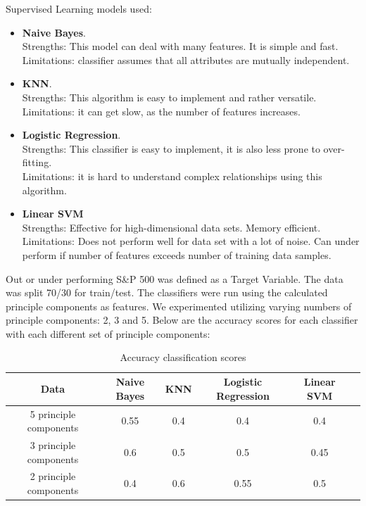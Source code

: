 \documentclass{article}
\begin{document}
Supervised Learning models used: 
\begin{itemize}
    \item \textbf{Naive Bayes}.\\
    Strengths: This model can deal with many features. It is simple and fast.\\ 
    Limitations: classifier assumes that all attributes are mutually independent. 
    \item\textbf{KNN}.\\
    Strengths: This algorithm is easy to implement and rather versatile.\\
    Limitations: it can get slow, as the number of features increases. 
    \item \textbf{Logistic Regression}.\\ 
    Strengths: This classifier is easy to implement, it is also less prone to over-fitting. \\
    Limitations: it is hard to understand complex relationships using this algorithm. 
    \item \textbf{Linear SVM}\\
    Strengths: Effective for high-dimensional data sets. Memory efficient.\\
    Limitations: Does not perform well for data set with a lot of noise. Can under perform if number of features exceeds number of training data samples.
\end{itemize}

Out or under performing S\&P 500 was defined as a Target Variable. The data was split 70/30 for train/test. The classifiers were run using the calculated principle components as features. We experimented utilizing varying numbers of principle components: 2, 3 and 5. Below are the accuracy scores for each classifier with each different set of principle components: 

\begin{table}[htb]
    \centering
    \begin{tabular}{c|c|c|c|c|c}
        \textbf{Data} & \textbf{Naive Bayes} & \textbf{KNN}& \textbf{Logistic Regression}& \textbf{Linear SVM}\\
        \hline
        5 principle components & 0.55 & 0.4 & 0.4 & 0.4  \\
        3 principle components & 0.6 & 0.5 & 0.5 & 0.45  \\
        2 principle components & 0.4 & 0.6 & 0.55 & 0.5  
    \end{tabular}
    \caption{Accuracy classification scores}
    \label{tab:Accuracyscore}
\end{table}
\end{document}
